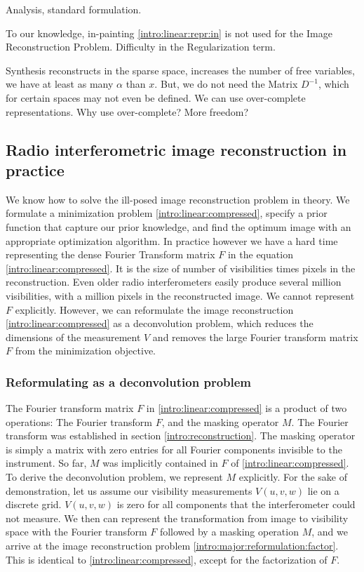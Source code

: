 Analysis, standard formulation.

To our knowledge, in-painting \eqref{intro:linear:repr:in} is not used for the Image Reconstruction Problem. Difficulty in the Regularization term. 

Synthesis reconstructs in the sparse space, increases the number of free variables, we have at least as many $\alpha$ than $x$. But, we do not need the Matrix $D^{-1}$, which for certain spaces may not even be defined. We can use over-complete representations.
Why use over-complete? More freedom?




\subsection{Radio interferometric image reconstruction in practice}\label{intro:major}
We know how to solve the ill-posed image reconstruction problem in theory. We formulate a minimization problem \eqref{intro:linear:compressed}, specify a prior function that capture our prior knowledge, and find the optimum image with an appropriate optimization algorithm. In practice however we have a hard time representing the dense Fourier Transform matrix $F$ in the equation \eqref{intro:linear:compressed}. It is the size of number of visibilities times pixels in the reconstruction. Even older radio interferometers easily produce several million visibilities, with a million pixels in the reconstructed image. We cannot represent $F$ explicitly. However, we can reformulate the image reconstruction \eqref{intro:linear:compressed} as a deconvolution problem, which reduces the dimensions of the measurement $V$ and removes the large Fourier transform matrix $F$ from the minimization objective.

\subsubsection{Reformulating as a deconvolution problem}\label{intro:major:reformulation}
The Fourier transform matrix $F$ in \eqref{intro:linear:compressed} is a product of two operations: The Fourier transform $F$, and the masking operator $M$. The Fourier transform was established in section \ref{intro:reconstruction}. The masking operator is simply a matrix with zero entries for all Fourier components invisible to the instrument. So far, $M$ was implicitly contained in $F$ of \eqref{intro:linear:compressed}. To derive the deconvolution problem, we represent $M$ explicitly. For the sake of demonstration, let us assume our visibility measurements $V(u, v ,w)$ lie on a discrete grid. $V(u, v, w)$ is zero for all components that the interferometer could not measure. We then can represent the transformation from image to visibility space with the Fourier transform $F$ followed by a masking operation $M$, and we arrive at the image reconstruction problem \eqref{intro:major:reformulation:factor}. This is identical to \eqref{intro:linear:compressed}, except for the factorization of $F$.

